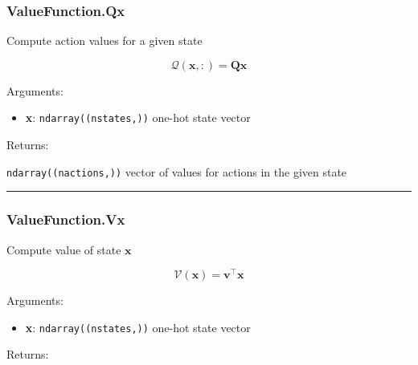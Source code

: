 \subsubsection{ValueFunction.Qx}\label{valuefunction.qx}

\begin{Shaded}
\begin{Highlighting}[]
\end{Highlighting}
\end{Shaded}

Compute action values for a given state

\[
\mathcal Q(\mathbf x, :) = \mathbf Q \mathbf x
\]

Arguments:

\begin{itemize}
\tightlist
\item
  \textbf{x}: \texttt{ndarray((nstates,))} one-hot state vector
\end{itemize}

Returns:

\texttt{ndarray((nactions,))} vector of values for actions in the given
state

\begin{center}\rule{0.5\linewidth}{\linethickness}\end{center}

\subsubsection{ValueFunction.Vx}\label{valuefunction.vx}

\begin{Shaded}
\begin{Highlighting}[]
\end{Highlighting}
\end{Shaded}

Compute value of state \(\mathbf x\)

\[
\mathcal V(\mathbf x) = \mathbf v^\top \mathbf x
\]

Arguments:

\begin{itemize}
\tightlist
\item
  \textbf{x}: \texttt{ndarray((nstates,))} one-hot state vector
\end{itemize}

Returns:

